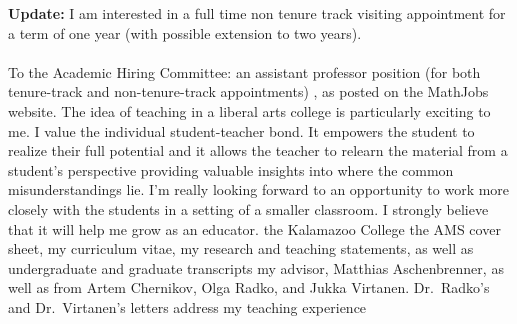 \documentclass[11pt]{letter}
\begin{document}



\def\teachliberalart{{The idea of teaching in a liberal arts college is particularly exciting to me.
I value the individual student-teacher bond.
It empowers the student to realize their full potential and it allows the teacher to relearn the material from a student's perspective providing valuable insights into where the common misunderstandings lie.
I'm really looking forward to an opportunity to work more closely with the students in a setting of a smaller classroom.
I strongly believe that it will help me grow as an educator.
}}
\def\joint{{

Unfortunately I will not be able to attend the joint AMS/MAA meetings this year.}}

\def\recommendation{{my advisor, Matthias Aschenbrenner, as well as from Artem Chernikov, Olga Radko, and Jukka Virtanen. Dr.~Radko's and Dr.~Virtanen's letters address my teaching experience}}
\def\three{{my advisor, Matthias Aschenbrenner, as well as from Olga Radko and Jukka Virtanen. Dr.~Radko's and Dr.~Virtanen's letters address my teaching experience}}
\def\teachrecommendation{{Olga Radko and Jukka Virtanen addressing my teaching experience}}

\def\mathjobs{{, as posted on the MathJobs website.}}

\def\generic {{the AMS cover sheet, my curriculum vitae, my research and teaching statements}}
\def\noresearch {{the AMS cover sheet, my curriculum vitae, and my teaching statement}}
\def\publication {{the AMS cover sheet, curriculum vitae, publication list, my research and teaching statements}}

\def\genintro{{To the Academic Hiring Committee:}}
\def\lecture{{a lecturer position in mathematics}}


\coverletter
  {}
  {\textbf{Update:} I am interested in a full time non tenure track visiting appointment for a term of one year (with possible extension to two years).\\ \ \\ \genintro}
  {an assistant professor position (for both tenure-track and non-tenure-track appointments)}
  {\mathjobs}
  {\teachliberalart}
  {the Kalamazoo College}
  {\generic, as well as undergraduate and graduate transcripts}
  {\recommendation}
\end{document}
